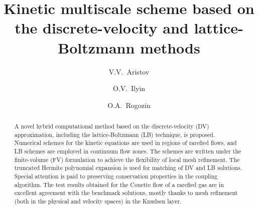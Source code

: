 \documentclass{elsarticle} %
\begin{document}
\begin{frontmatter}

\title{Kinetic multiscale scheme based on the discrete-velocity and lattice-Boltzmann methods}

\author[ccas]{V.V.~Aristov}
\author[ccas]{O.V.~Ilyin}
\author[skoltech,ccas]{O.A.~Rogozin}

\address[ccas]{Dorodnicyn Computing Center,
    Federal Research Center "Computer Science and Control" of Russian Academy of Science, Moscow, Russia}
\address[skoltech]{Center for Design, Manufacturing, and Materials,
    Skolkovo Institute of Science and Technology, Moscow, Russia}

\begin{abstract}

A novel hybrid computational method based on the discrete-velocity (DV) approximation,
including the lattice-Boltzmann (LB) technique, is proposed.
Numerical schemes for the kinetic equations are used in regions of rarefied flows,
and LB schemes are employed in continuum flow zones.
The schemes are written under the finite-volume (FV) formulation to achieve
the flexibility of local mesh refinement.
The truncated Hermite polynomial expansion is used for matching of DV and LB solutions.
Special attention is paid to preserving conservation properties in the coupling algorithm.
The test results obtained for the Couette flow of a rarefied gas
are in excellent agreement with the benchmark solutions,
mostly thanks to mesh refinement (both in the physical and velocity spaces) in the Knudsen layer.






\end{abstract}
\end{frontmatter}
\end{document}
